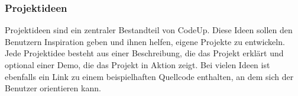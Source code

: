 \documentclass[main.tex]{subfiles}
\begin{document}
    \subsubsection{Projektideen}
    Projektideen sind ein zentraler Bestandteil von CodeUp.
    Diese Ideen sollen den Benutzern Inspiration geben und ihnen helfen, eigene Projekte zu entwickeln.
    Jede Projektidee besteht aus einer Beschreibung, die das Projekt erklärt und optional einer Demo, die das Projekt in Aktion zeigt.
    Bei vielen Ideen ist ebenfalls ein Link zu einem beispielhaften Quellcode enthalten, an dem sich der Benutzer orientieren kann.
\end{document}
